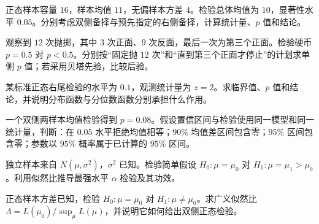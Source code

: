 \begin{exercise}[单侧与双侧 t 检验]\label{q:M-P9-1}
正态样本容量 $16$，样本均值 $11$，无偏样本方差 $4$。检验总体均值为 $10$，显著性水平 $0.05$。分别考虑双侧备择与预先指定的右侧备择，计算统计量、$p$ 值和结论。\par{}\end{exercise}

\begin{exercise}[停止规则改变抽样分布]\label{q:M-P9-2}
观察到 $12$ 次抛掷，其中 $3$ 次正面、$9$ 次反面，最后一次为第三个正面。检验硬币 $p=0.5$ 对 $p<0.5$。分别按“固定抛 $12$ 次”和“直到第三个正面才停止”的计划求单侧 $p$ 值；若采用贝塔先验，比较后验。\par{}\end{exercise}

\begin{exercise}[正态右尾检验的分位数]\label{q:M-E2-II4}
某标准正态右尾检验的水平为 $0.1$，观测统计量为 $z=2$。求临界值、$p$ 值和结论，并说明分布函数与分位数函数分别承担什么作用。\par{}\end{exercise}

\begin{exercise}[检验与置信区间对偶]\label{q:M-F-C10}
一个双侧两样本均值检验得到 $p=0.08$。假设置信区间与检验使用同一模型和同一统计量，判断：在 $0.05$ 水平拒绝均值相等；$90\%$ 均值差区间包含零；$95\%$ 区间包含零；参数以 $95\%$ 概率属于已计算的 $95\%$ 区间。\par{}\end{exercise}

\begin{exercise}[奈曼—皮尔逊检验]\label{q:B14.1}
独立样本来自 $N(\mu,\sigma^2)$，$\sigma^2$ 已知。检验简单假设 $H_0:\mu=\mu_0$ 对 $H_1:\mu=\mu_1>\mu_0$。利用似然比推导最强水平 $\alpha$ 检验及其功效。\par{}\end{exercise}

\begin{exercise}[正态均值的似然比检验]\label{q:B14.2}
正态样本方差已知，检验 $H_0:\mu=\mu_0$ 对 $H_1:\mu\ne\mu_0$。求广义似然比 $\Lambda=L(\mu_0)/\sup_\mu L(\mu)$，并说明它如何给出双侧正态检验。\par{}\end{exercise}

